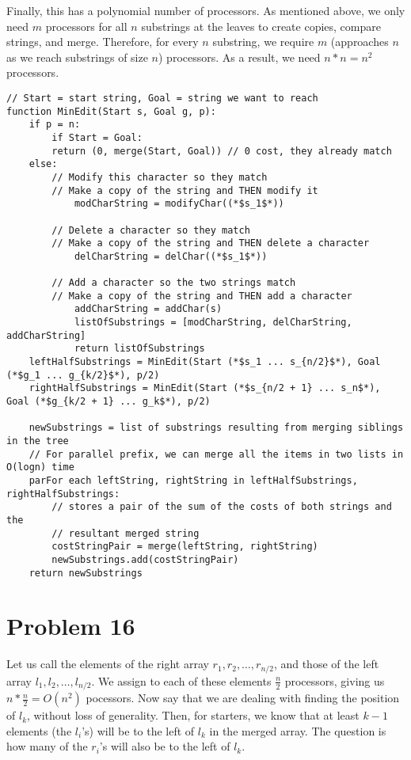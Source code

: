 \documentclass{article}
\providecommand{\prob}[1]{\section*{Problem #1}}
\begin{document}
Finally, this has a polynomial number of processors.  As mentioned above, we only need $m$ processors for all $n$ substrings at the leaves to create copies, compare strings, and merge.  Therefore, for every $n$ substring, we require $m$ (approaches $n$ as we reach substrings of size $n$) processors.  As a result, we need $n*n = n^2$ processors.
\pagebreak
\begin{lstlisting}
// Start = start string, Goal = string we want to reach
function MinEdit(Start s, Goal g, p):
    if p = n:
        if Start = Goal:
	    return (0, merge(Start, Goal)) // 0 cost, they already match
	else:
	    // Modify this character so they match
	    // Make a copy of the string and THEN modify it
            modCharString = modifyChar((*$s_1$*))
	
	    // Delete a character so they match
	    // Make a copy of the string and THEN delete a character
            delCharString = delChar((*$s_1$*))
			
	    // Add a character so the two strings match
	    // Make a copy of the string and THEN add a character
            addCharString = addChar(s)
            listOfSubstrings = [modCharString, delCharString, addCharString]
            return listOfSubstrings
    leftHalfSubstrings = MinEdit(Start (*$s_1 ... s_{n/2}$*), Goal (*$g_1 ... g_{k/2}$*), p/2)
    rightHalfSubstrings = MinEdit(Start (*$s_{n/2 + 1} ... s_n$*), Goal (*$g_{k/2 + 1} ... g_k$*), p/2)
	
    newSubstrings = list of substrings resulting from merging siblings in the tree
    // For parallel prefix, we can merge all the items in two lists in O(logn) time
    parFor each leftString, rightString in leftHalfSubstrings, rightHalfSubstrings:
        // stores a pair of the sum of the costs of both strings and the 
        // resultant merged string
        costStringPair = merge(leftString, rightString)
        newSubstrings.add(costStringPair)
    return newSubstrings
\end{lstlisting}
\pagebreak
\prob{16}
Let us call the elements of the right array $r_1, r_2, \dots, r_{n/2}$, and those of the left array $l_1, l_2, \dots, l_{n/2}$.
We assign to each of these elements $\frac{n}{2}$ processors, giving us $n * \frac{n}{2} = O(n^2)$ pocessors.
Now say that we are dealing with finding the position of $l_k$, without loss of generality.
Then, for starters, we know that at least $k-1$ elements (the $l_i$'s) will be to the left of $l_k$ in the merged array.
The question is how many of the $r_i$'s will also be to the left of $l_k$.
\end{document}

